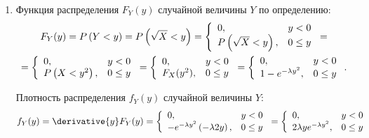 \documentclass[12pt,a4paper]{article}
\begin{document}
    \begin{enumerate}
        \item Функция распределения $F_Y(y)$ случайной величины $Y$ по определению:
        \begin{multline*}
            F_Y(y) = P \left ( Y < y \right ) = P \left ( \sqrt{X} < y \right )
            = \left \{
            \begin{array}{ll}
                0 ,                         & y < 0   \\
                P \left ( \sqrt{X} < y \right ), & 0 \le y
            \end{array}
            \right . = \\
            = \left \{
            \begin{array}{ll}
                0 ,                    & y < 0   \\
                P \left ( X < y^2 \right ), & 0 \le y
            \end{array}
            \right .
            = \left \{
            \begin{array}{ll}
                0 ,       & y < 0   \\
                F_X(y^2), & 0 \le y
            \end{array}
            \right .
            = \left \{
            \begin{array}{ll}
                0 ,                    & y < 0   \\
                1 - e^{- \lambda y^2}, & 0 \le y
            \end{array}
            \right .
            .
        \end{multline*}

        Плотность распределения $f_Y(y)$ случайной величины $Y$:
        \begin{equation}
            f_Y(y)
            = \derivative{y} F_Y(y)
            = \left \{
            \begin{array}{ll}
                0 ,                                                 & y < 0   \\
                - e^{- \lambda y^2} \left ( - \lambda 2 y \right ), & 0 \le y
            \end{array}
            \right .
            = \left \{
            \begin{array}{ll}
                0 ,                            & y < 0   \\
                2 \lambda y e^{- \lambda y^2}, & 0 \le y
            \end{array}
            \right .
        \end{equation}


\end{enumerate}
\end{document}
